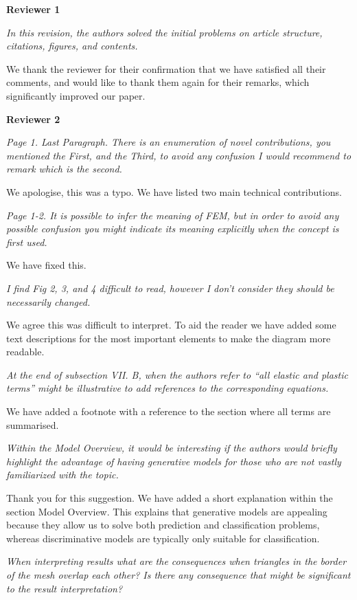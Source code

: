 \documentclass[letterpaper,12pt]{letter}
\begin{document}
\textbf{Reviewer 1}

\emph{In this revision, the authors solved the initial problems on article structure, citations, figures, and contents.}

We thank the reviewer for their confirmation that we have satisfied all their comments, and would like to thank them again for their remarks, which significantly improved our paper.

\textbf{Reviewer 2}

\emph{Page 1. Last Paragraph. There is an enumeration of novel contributions, you mentioned the First, and the Third, to avoid any confusion I would recommend to remark which is the second.}

We apologise, this was a typo. We have listed two main technical contributions.

\emph{Page 1-2. It is possible to infer the meaning of FEM, but in order to avoid any possible confusion you might indicate its meaning explicitly when the concept is first used.}

We have fixed this.

\emph{I find Fig 2, 3, and 4 difficult to read, however I don’t consider they should be necessarily changed.}

We agree this was difficult to interpret. To aid the reader we have added some text descriptions for the most important elements to make the diagram more readable.

\emph{At the end of subsection VII. B, when the authors refer to “all elastic and plastic terms” might be illustrative to add references to the corresponding equations.}

We have added a footnote with a reference to the section where all terms are summarised.

\emph{Within the Model Overview, it would be interesting if the authors would briefly highlight the advantage of having generative models for those who are not vastly familiarized with the topic.}

Thank you for this suggestion. We have added a short explanation within the section Model Overview. This explains that generative models are appealing because they allow us to solve both prediction and classification problems, whereas discriminative models are typically only suitable for classification.

\emph{When interpreting results what are the consequences when triangles in the border of the mesh overlap each other? Is there any consequence that might be significant to the result interpretation?}
\end{document}
